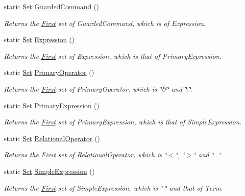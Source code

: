 \begin{DoxyCompactItemize}
static \hyperlink{classSet}{Set} \hyperlink{classFirst_aab66c404b95b67ab14b31bfeaa400eb0}{GuardedCommand} ()
\begin{DoxyCompactList}\small\item\em Returns the \hyperlink{classFirst}{First} set of GuardedCommand, which is of Expression. \item\end{DoxyCompactList}\item 
static \hyperlink{classSet}{Set} \hyperlink{classFirst_a151428da8e728244184a256f94c16fd2}{Expression} ()
\begin{DoxyCompactList}\small\item\em Returns the \hyperlink{classFirst}{First} set of Expression, which is that of PrimaryExpression. \item\end{DoxyCompactList}\item 
static \hyperlink{classSet}{Set} \hyperlink{classFirst_a8fc3bc98fd57866b459cce1edd5c1925}{PrimaryOperator} ()
\begin{DoxyCompactList}\small\item\em Returns the \hyperlink{classFirst}{First} set of PrimaryOperator, which is \char`\"{}\&\char`\"{} and \char`\"{}$|$\char`\"{}. \item\end{DoxyCompactList}\item 
static \hyperlink{classSet}{Set} \hyperlink{classFirst_ae25d77238175a4e13893ef54650c6276}{PrimaryExpression} ()
\begin{DoxyCompactList}\small\item\em Returns the \hyperlink{classFirst}{First} set of PrimaryExpression, which is that of SimpleExpression. \item\end{DoxyCompactList}\item 
static \hyperlink{classSet}{Set} \hyperlink{classFirst_a261d760170710c35d83cf5d31d4d252c}{RelationalOperator} ()
\begin{DoxyCompactList}\small\item\em Returns the \hyperlink{classFirst}{First} set of RelationalOperator, which is \char`\"{}$<$\char`\"{}, \char`\"{}$>$\char`\"{} and \char`\"{}=\char`\"{}. \item\end{DoxyCompactList}\item 
static \hyperlink{classSet}{Set} \hyperlink{classFirst_a414ede2339bc646cd2d6472d8f887376}{SimpleExpression} ()
\begin{DoxyCompactList}\small\item\em Returns the \hyperlink{classFirst}{First} set of SimpleExpression, which is \char`\"{}-\/\char`\"{} and that of Term. \item\end{DoxyCompactList}\item 

\end{DoxyCompactItemize}

